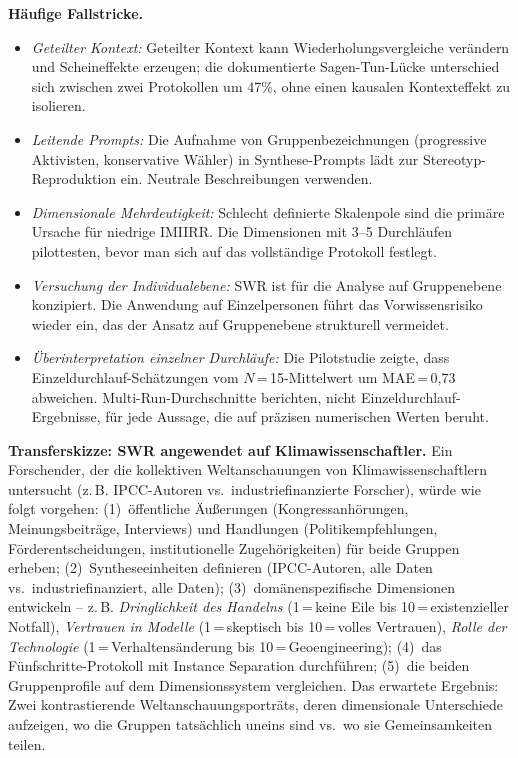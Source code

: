 \documentclass[11pt,a4paper]{article}
\begin{document}
\textbf{Häufige Fallstricke.}
\begin{itemize}[nosep]
  \item \emph{Geteilter Kontext:} Geteilter Kontext kann Wiederholungsvergleiche verändern und Scheineffekte erzeugen; die dokumentierte Sagen-Tun-Lücke unterschied sich zwischen zwei Protokollen um 47\%, ohne einen kausalen Kontexteffekt zu isolieren.
  \item \emph{Leitende Prompts:} Die Aufnahme von Gruppenbezeichnungen (\glqq{}progressive Aktivisten\grqq{}, \glqq{}konservative Wähler\grqq{}) in Synthese-Prompts lädt zur Stereotyp-Reproduktion ein. Neutrale Beschreibungen verwenden.
  \item \emph{Dimensionale Mehrdeutigkeit:} Schlecht definierte Skalenpole sind die primäre Ursache für niedrige IMIIRR. Die Dimensionen mit 3--5 Durchläufen pilottesten, bevor man sich auf das vollständige Protokoll festlegt.
  \item \emph{Versuchung der Individualebene:} SWR ist für die Analyse auf Gruppenebene konzipiert. Die Anwendung auf Einzelpersonen führt das Vorwissensrisiko wieder ein, das der Ansatz auf Gruppenebene strukturell vermeidet.
  \item \emph{Überinterpretation einzelner Durchläufe:} Die Pilotstudie zeigte, dass Einzeldurchlauf-Schätzungen vom $N$\,=\,15-Mittelwert um MAE\,=\,0,73 abweichen. Multi-Run-Durchschnitte berichten, nicht Einzeldurchlauf-Ergebnisse, für jede Aussage, die auf präzisen numerischen Werten beruht.
\end{itemize}

\textbf{Transferskizze: SWR angewendet auf Klimawissenschaftler.} Ein Forschender, der die kollektiven Weltanschauungen von Klimawissenschaftlern untersucht (z.\,B. IPCC-Autoren vs.\ industriefinanzierte Forscher), würde wie folgt vorgehen: (1)~öffentliche Äußerungen (Kongressanhörungen, Meinungsbeiträge, Interviews) und Handlungen (Politikempfehlungen, Förderentscheidungen, institutionelle Zugehörigkeiten) für beide Gruppen erheben; (2)~Syntheseeinheiten definieren (\glqq{}IPCC-Autoren, alle Daten\grqq{} vs.\ \glqq{}industriefinanziert, alle Daten\grqq{}); (3)~domänenspezifische Dimensionen entwickeln -- z.\,B. \emph{Dringlichkeit des Handelns} (1\,=\,keine Eile bis 10\,=\,existenzieller Notfall), \emph{Vertrauen in Modelle} (1\,=\,skeptisch bis 10\,=\,volles Vertrauen), \emph{Rolle der Technologie} (1\,=\,Verhaltensänderung bis 10\,=\,Geoengineering); (4)~das Fünfschritte-Protokoll mit Instance Separation durchführen; (5)~die beiden Gruppenprofile auf dem Dimensionssystem vergleichen. Das erwartete Ergebnis: Zwei kontrastierende Weltanschauungsporträts, deren dimensionale Unterschiede aufzeigen, wo die Gruppen tatsächlich uneins sind vs.\ wo sie Gemeinsamkeiten teilen.
\end{document}

